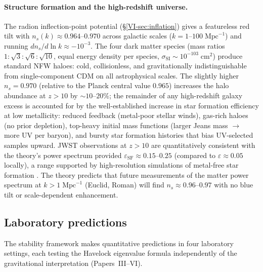\paragraph{Structure formation and the high-redshift universe.}
The radion inflection-point potential
(\S\ref{VI-sec:inflation}) gives a featureless red tilt
with $n_s(k) \approx 0.964$--$0.970$ across galactic scales
($k = 1$--$100\;\mathrm{Mpc}^{-1}$) and running
$dn_s/d\ln k \approx -10^{-3}$.
The four dark matter species (mass ratios
$1{:}\sqrt{3}{:}\sqrt{6}{:}\sqrt{10}$, equal energy density
per species, $\sigma_{\mathrm{SI}} \sim 10^{-103}\;\mathrm{cm}^2$)
produce standard NFW haloes: cold, collisionless, and
gravitationally indistinguishable from single-component CDM
on all astrophysical scales.
The slightly higher $n_s = 0.970$ (relative to the
Planck central value $0.965$) increases the halo abundance
at $z > 10$ by $\sim\!10$--$20\%$; the remainder of any
high-redshift galaxy excess is accounted for by the
well-established increase in star formation efficiency
at low metallicity: reduced feedback
(metal-poor stellar winds), gas-rich haloes
(no prior depletion), top-heavy initial mass functions
(larger Jeans mass $\to$ more UV per baryon),
and bursty star formation histories
that bias UV-selected samples upward.
JWST observations at $z > 10$
\citep{Labbe2023,Castellano2022,Naidu2022}
are quantitatively consistent with the theory's
power spectrum provided $\varepsilon_{\mathrm{SF}} \approx
0.15$--$0.25$ (compared to $\varepsilon \approx 0.05$ locally),
a range supported by high-resolution simulations
of metal-free star formation \citep{Bromm2013}.
The theory predicts that future measurements of the
matter power spectrum at $k > 1\;\mathrm{Mpc}^{-1}$
(Euclid, Roman) will find $n_s \approx 0.96$--$0.97$
with no blue tilt or scale-dependent enhancement.

\subsection{Laboratory predictions}
\label{sec:laboratory}

The stability framework makes quantitative predictions
in four laboratory settings, each testing the Havelock
eigenvalue formula independently of the gravitational
interpretation (Papers~III--VI).

